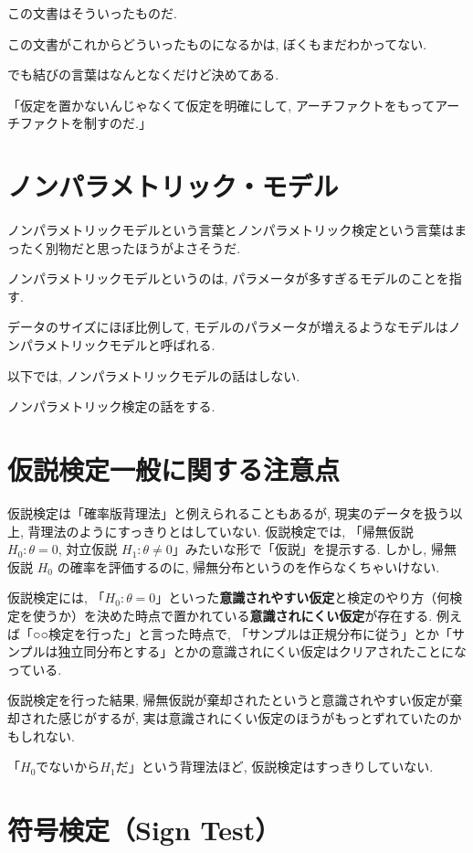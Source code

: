 \documentclass[12pt]{jsarticle}
\begin{document}
この文書はそういったものだ. 

この文書がこれからどういったものになるかは, ぼくもまだわかってない.

でも結びの言葉はなんとなくだけど決めてある. 

「仮定を置かないんじゃなくて仮定を明確にして, アーチファクトをもってアーチファクトを制すのだ.」

\section{ノンパラメトリック・モデル}

ノンパラメトリックモデルという言葉とノンパラメトリック検定という言葉はまったく別物だと思ったほうがよさそうだ.

ノンパラメトリックモデルというのは, パラメータが多すぎるモデルのことを指す.

データのサイズにほぼ比例して, モデルのパラメータが増えるようなモデルはノンパラメトリックモデルと呼ばれる. 

以下では, ノンパラメトリックモデルの話はしない. 

ノンパラメトリック検定の話をする. 

\section{仮説検定一般に関する注意点}

仮説検定は「確率版背理法」と例えられることもあるが, 現実のデータを扱う以上, 背理法のようにすっきりとはしていない.
仮説検定では, 「帰無仮説 $H_0: \theta = 0$, 対立仮説 $H_1: \theta \neq 0$」みたいな形で「仮説」を提示する. 
しかし, 帰無仮説 $H_0$ の確率を評価するのに, 帰無分布というのを作らなくちゃいけない.

仮説検定には, 「$H_0: \theta = 0$」といった\textbf{意識されやすい仮定}と検定のやり方（何検定を使うか）を決めた時点で置かれている\textbf{意識されにくい仮定}が存在する. 例えば「○○検定を行った」と言った時点で, 「サンプルは正規分布に従う」とか「サンプルは独立同分布とする」とかの意識されにくい仮定はクリアされたことになっている. 

仮説検定を行った結果, 帰無仮説が棄却されたというと意識されやすい仮定が棄却された感じがするが, 実は意識されにくい仮定のほうがもっとずれていたのかもしれない.

「$H_0$でないから$H_1$だ」という背理法ほど, 仮説検定はすっきりしていない.

\section{符号検定（Sign Test）}
\end{document}
